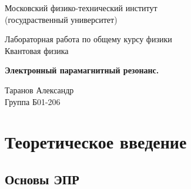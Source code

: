\documentclass[a4paper, 12pt]{article} %
\begin{document}
	
	\begin{titlepage}
		
		\newpage
		\begin{center}
			\normalsize Московский физико-технический институт \\(госудраственный университет)
		\end{center}
		
		\vspace{6em}
		
		\begin{center}
			\Large Лабораторная работа по общему курсу физики\\Квантовая физика
		\end{center}
		
		\vspace{1em}
		
		\begin{center}
			\Large \textbf{Электронный парамагнитный резонанс.}
		\end{center}
		
		\vspace{2em}
		
		\begin{center}
			\large Таранов Александр \\
			Группа Б01-206
		\end{center}
		
		\vspace{\fill}
		
	\end{titlepage}
	
	
	
	\thispagestyle{empty}
	\newpage
	\tableofcontents
	\newpage
	\setcounter{page}{1}

\section{Теоретическое введение}
	
	\subsection{Основы ЭПР}
	
\end{document}
